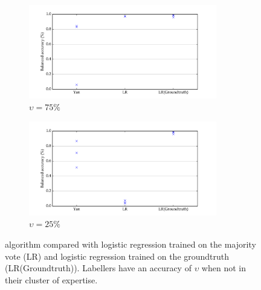         \begin{figure}
            \centering
            \begin{subfigure}{\textwidth}
                \centering
                \includegraphics[width=0.9\textwidth]
                    {images/experiments/yan_25pc_noise.pdf}
                \caption{$\upsilon = 75\%$}
                \label{fig:yan-experiment-low-noise}
            \end{subfigure}
            \begin{subfigure}{\textwidth}
                \centering
                \includegraphics[width=0.9\textwidth]
                    {images/experiments/yan_75pc_noise.pdf}
                \caption{$\upsilon = 25\%$}
                \label{fig:yan-experiment-high-noise}
            \end{subfigure}
            \caption{\citeauthor{yan10} algorithm compared with logistic
                regression trained on the majority vote (LR) and logistic
                regression trained on the groundtruth (LR(Groundtruth)).
                Labellers have an accuracy of $\upsilon$ when not in
                their cluster of expertise.}
        \end{figure}

